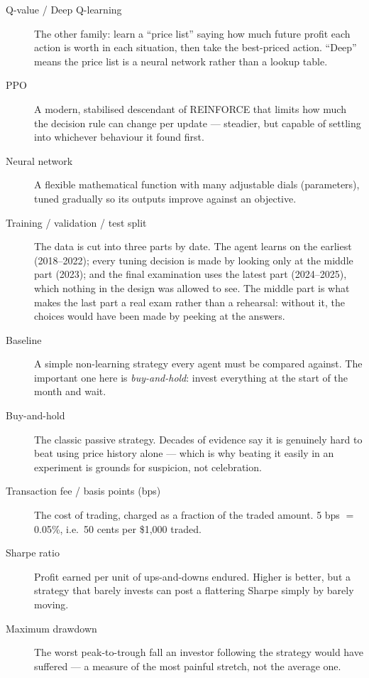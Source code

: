 \begin{description}
  \item[Q-value / Deep Q-learning] The other family: learn a ``price
  list'' saying how much future profit each action is worth in each
  situation, then take the best-priced action. ``Deep'' means the price
  list is a neural network rather than a lookup table.

  \item[PPO] A modern, stabilised descendant of REINFORCE that limits how
  much the decision rule can change per update --- steadier, but capable
  of settling into whichever behaviour it found first.

  \item[Neural network] A flexible mathematical function with many
  adjustable dials (parameters), tuned gradually so its outputs improve
  against an objective.

  \item[Training / validation / test split] The data is cut into three parts
  by date. The agent learns on the earliest (2018--2022); every tuning
  decision is made by looking only at the middle part (2023); and the final
  examination uses the latest part (2024--2025), which nothing in the design
  was allowed to see. The middle part is what makes the last part a real
  exam rather than a rehearsal: without it, the choices would have been made
  by peeking at the answers.

  \item[Baseline] A simple non-learning strategy every agent must be
  compared against. The important one here is \emph{buy-and-hold}:
  invest everything at the start of the month and wait.

  \item[Buy-and-hold] The classic passive strategy. Decades of evidence
  say it is genuinely hard to beat using price history alone --- which is
  why beating it easily in an experiment is grounds for suspicion, not
  celebration.

  \item[Transaction fee / basis points (bps)] The cost of trading,
  charged as a fraction of the traded amount. 5 bps $=$ 0.05\%, i.e.\
  50 cents per \$1{,}000 traded.

  \item[Sharpe ratio] Profit earned per unit of ups-and-downs endured.
  Higher is better, but a strategy that barely invests can post a
  flattering Sharpe simply by barely moving.

  \item[Maximum drawdown] The worst peak-to-trough fall an investor
  following the strategy would have suffered --- a measure of the most
  painful stretch, not the average one.


\end{description}
